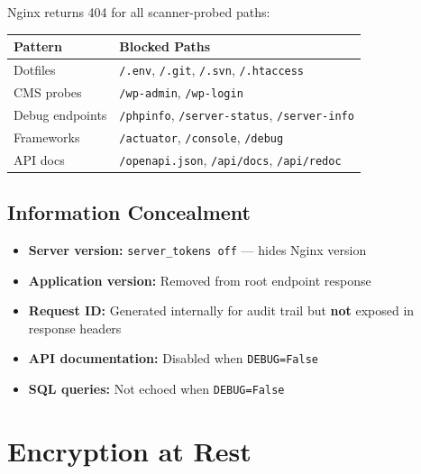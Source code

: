 \documentclass[11pt,a4paper]{article}
\begin{document}
Nginx returns 404 for all scanner-probed paths:

\begin{center}
\begin{tabular}{ll}
\toprule
\textbf{Pattern} & \textbf{Blocked Paths} \\
\midrule
Dotfiles & \texttt{/.env}, \texttt{/.git}, \texttt{/.svn}, \texttt{/.htaccess} \\
CMS probes & \texttt{/wp-admin}, \texttt{/wp-login} \\
Debug endpoints & \texttt{/phpinfo}, \texttt{/server-status}, \texttt{/server-info} \\
Frameworks & \texttt{/actuator}, \texttt{/console}, \texttt{/debug} \\
API docs & \texttt{/openapi.json}, \texttt{/api/docs}, \texttt{/api/redoc} \\
\bottomrule
\end{tabular}
\end{center}

\subsection{Information Concealment}

\begin{itemize}[nosep]
  \item \textbf{Server version:} \texttt{server\_tokens off} — hides Nginx version
  \item \textbf{Application version:} Removed from root endpoint response
  \item \textbf{Request ID:} Generated internally for audit trail but \textbf{not} exposed in response headers
  \item \textbf{API documentation:} Disabled when \texttt{DEBUG=False}
  \item \textbf{SQL queries:} Not echoed when \texttt{DEBUG=False}
\end{itemize}

\section{Encryption at Rest}
\end{document}
